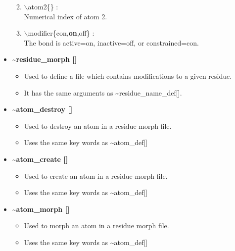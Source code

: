 \begin{itemize}
\begin{enumerate}
 \vspace{0.15in} \Large
 \item  $\backslash$atom2\{\} : \\
   \large
   Numerical index of atom 2.

 \vspace{0.15in} \Large
 \item  $\backslash$modifier\{con,{\bf on},off\} : \\
   \large
   The bond is active=on, inactive=off, or constrained=con.

\end{enumerate}
\clearpage
\huge
\item [] {\bf \~{ }residue\_morph []}
\begin{itemize}
 \large \item Used to define a file which contains modifications to 
              a given residue.
 \large \item It has the same arguments as \~{ }residue\_name\_def[].
\end{itemize}
\huge
\item [] {\bf \~{ }atom\_destroy []}
\begin{itemize}
 \large  \item Used to destroy an atom in a residue morph file.
 \large  \item Uses the same key words as \~{ }atom\_def[]
\end{itemize}
\huge
\item [] {\bf \~{ }atom\_create []}
\begin{itemize}
 \large  \item Used to create an atom in a residue morph file.
 \large  \item Uses the same key words as \~{ }atom\_def[]
\end{itemize}
\huge
\item [] {\bf \~{ }atom\_morph []}
\begin{itemize}
 \large  \item Used to morph an atom in a residue morph file.
 \large  \item Uses the same key words as \~{ }atom\_def[]
\end{itemize}

\end{itemize}


